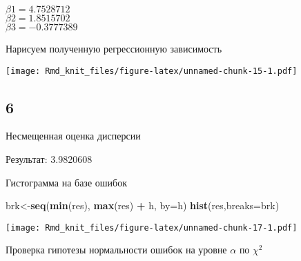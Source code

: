 \documentclass[]{article}
\newenvironment{Shaded}{\begin{snugshade}}{\end{snugshade}}
\newcommand{\DataTypeTok}[1]{\textcolor[rgb]{0.13,0.29,0.53}{#1}}
\newcommand{\DecValTok}[1]{\textcolor[rgb]{0.00,0.00,0.81}{#1}}
\newcommand{\KeywordTok}[1]{\textcolor[rgb]{0.13,0.29,0.53}{\textbf{#1}}}
\newcommand{\NormalTok}[1]{#1}
\newcommand{\OperatorTok}[1]{\textcolor[rgb]{0.81,0.36,0.00}{\textbf{#1}}}
\newcommand{\StringTok}[1]{\textcolor[rgb]{0.31,0.60,0.02}{#1}}
\begin{document}
\(\beta1=4.7528712\)\\
\(\beta2=1.8515702\)\\
\(\beta3=-0.3777389\)

Нарисуем полученную регрессионную зависимость

\texttt{[image: Rmd\_knit\_files/figure-latex/unnamed-chunk-15-1.pdf]}

\hypertarget{section-5}{%
\subsection{6}\label{section-5}}

Несмещенная оценка дисперсии

\begin{Shaded}
\end{Shaded}

Результат: 3.9820608

Гистограмма на базе ошибок

\begin{Shaded}
\begin{Highlighting}[]
\NormalTok{brk<-}\KeywordTok{seq}\NormalTok{(}\KeywordTok{min}\NormalTok{(res), }\KeywordTok{max}\NormalTok{(res) }\OperatorTok{+}\StringTok{ }\NormalTok{h, }\DataTypeTok{by=}\NormalTok{h)}
\KeywordTok{hist}\NormalTok{(res,}\DataTypeTok{breaks=}\NormalTok{brk)}
\end{Highlighting}
\end{Shaded}

\texttt{[image: Rmd\_knit\_files/figure-latex/unnamed-chunk-17-1.pdf]}

Проверка гипотезы нормальности ошибок на уровне \(\alpha\) по \(\chi^2\)
\end{document}

